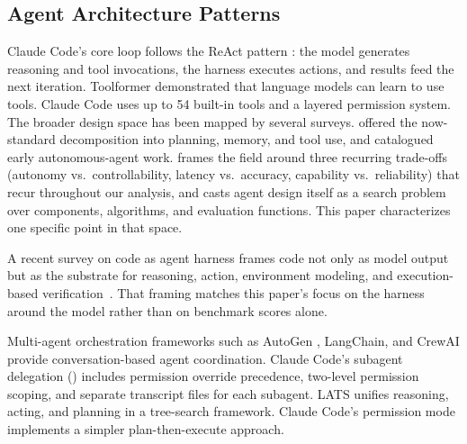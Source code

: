 \subsection{Agent Architecture Patterns}
\label{sec:related:patterns}

Claude Code's core loop follows the ReAct pattern \citep{yao2022react}: the model generates reasoning and tool invocations, the harness executes actions, and results feed the next iteration. Toolformer \citep{schick2023toolformer} demonstrated that language models can learn to use tools. Claude Code uses up to 54 built-in tools and a layered permission system. The broader design space has been mapped by several surveys. \citet{weng2023agent} offered the now-standard decomposition into planning, memory, and tool use, and \citet{wang2024agentsurvey} catalogued early autonomous-agent work. \citet{xu2026agentsystems} frames the field around three recurring trade-offs (autonomy vs.\ controllability, latency vs.\ accuracy, capability vs.\ reliability) that recur throughout our analysis, and \citet{hu2025adas} casts agent design itself as a search problem over components, algorithms, and evaluation functions. This paper characterizes one specific point in that space.

A recent survey on code as agent harness frames code not only as model output but as the substrate for reasoning, action, environment modeling, and execution-based verification~\citep{ning2026codeharness}. That framing matches this paper's focus on the harness around the model rather than on benchmark scores alone.

Multi-agent orchestration frameworks such as AutoGen \citep{wu2024autogen}, LangChain, and CrewAI provide conversation-based agent coordination. Claude Code's subagent delegation () includes permission override precedence, two-level permission scoping, and separate transcript files for each subagent. LATS \citep{zhou2024lats} unifies reasoning, acting, and planning in a tree-search framework. Claude Code's  permission mode implements a simpler plan-then-execute approach.

